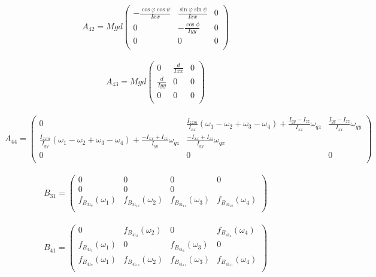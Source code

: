 \begin{equation}
A_{42}=Mgd\left(\begin{array}{ccc}
-\frac{\cos\varphi\cos\psi}{I{xx}} & \frac{\sin\varphi\sin\psi}{I{xx}} & 0 \\
0 & -\frac{\cos\phi}{I{yy}} &0 \\
0 & 0& 0 \\
\end{array}\right)
\end{equation}\\
\begin{equation}
A_{43}=Mgd\left(\begin{array}{ccc}
0 & \frac{d}{I{xx}} & 0 \\
\frac{d}{I{yy}} & 0 &0 \\
0 & 0& 0 \\
\end{array}\right)
\end{equation}\\
\begin{equation}
A_{44}=\left(\begin{array}{ccc}
0 &\frac{I_{zzm}}{I_{xx}}(\omega_1-\omega_2+\omega_3-\omega_4) + \frac{I_{yy}-I_{zz}}{I_{xx}}\omega_{qz}& \frac{I_{yy}-I_{zz}}{I_{xx}}\omega_{qy} \\
\frac{I_{zzm}}{I_{yy}}(\omega_1-\omega_2+\omega_3-\omega_4) + \frac{-I_{xx}+I_{zz}}{I_{yy}}\omega_{qz} & \frac{-I_{xx}+I_{zz}}{I_{yy}}\omega_{qx}\\
0&0&0\\
\end{array}\right)
\end{equation}\\

\begin{equation}
B_{31}=\left(\begin{array}{cccc}
0 & 0 & 0 &0\\
0&0&0\\
f_{B_{31_9}}(\omega_1) & f_{B_{31_10}}(\omega_2) & f_{B_{31_11}}(\omega_3) &f_{B_{31_12}}(\omega_4)\\
\end{array}\right)
\end{equation}\\

\begin{equation}
B_{41}=\left(\begin{array}{cccc}
0 & f_{B_{41_2}}(\omega_2) & 0 & f_{B_{41_4}}(\omega_4)\\
f_{B_{41_5}}(\omega_1)&0&f_{B_{41_6}}(\omega_3)&0\\
f_{B_{41_9}}(\omega_1) & f_{B_{41_10}}(\omega_2) & f_{B_{41_11}}(\omega_3) &f_{B_{41_11}}(\omega_4)\\
\end{array}\right)
\end{equation}\\

